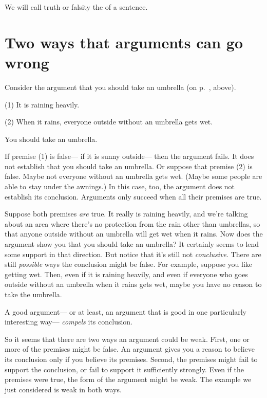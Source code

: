 We will call truth or falsity the  of a sentence.



\section{Two ways that arguments can go wrong}
Consider the argument that you should take an umbrella (on p.~\pageref{argRaining}, above).

\begin{earg}
\item[(1)] It is raining heavily.
\item[(2)] When it rains, everyone outside without an umbrella gets wet.
\item[\therefore] You should take an umbrella.
\end{earg}

If premise (1) is false--- if it is sunny outside--- then the argument fails. It does not establish that you should take an umbrella. Or suppose that premise (2) is false. Maybe not everyone without an umbrella gets wet. (Maybe some people are able to stay under the awnings.) In this case, too, the argument does not establish its conclusion. Arguments only succeed when all their premises are true.

Suppose both premises \emph{are} true. It really is raining heavily, and we're talking about an area where there's no protection from the rain other than umbrellas, so that anyone outside without an umbrella will get wet when it rains. Now does the argument show you that you should take an umbrella? It certainly seems to lend some support in that direction. But notice that it's still not \emph{conclusive}. There are still \emph{possible} ways the conclusion might be false. For example, suppose you like getting wet. Then, even if it is raining heavily, and even if everyone who goes outside without an umbrella when it rains gets wet, maybe you have no reason to take the umbrella.

A good argument--- or at least, an argument that is good in one particularly interesting way--- \emph{compels} its conclusion.

So it seems that there are two ways an argument could be weak. First, one or more of the premises might be false. An argument gives you a reason to believe its conclusion only if you believe its premises. Second, the premises might fail to support the conclusion, or fail to support it sufficiently strongly. Even if the premises were true, the form of the argument might be weak. The example we just considered is weak in both ways.

